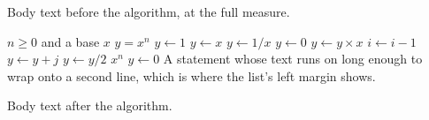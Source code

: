 \documentclass{article}
\begin{document}
Body text before the algorithm, at the full measure.

\begin{algorithmic}[1]
\Require $n \ge 0$ and a base $x$
\Ensure $y = x^{n}$
\State $y \gets 1$
  \State $y \gets x$ 
  \State $y \gets 1 / x$
\Else
  \State $y \gets 0$
\EndIf
{}
    \State $y \gets y \times x$
    \State $i \gets i - 1$
  \EndWhile
\EndFor
{}
  \State $y \gets y + j$
\EndFor
\Repeat
  \State $y \gets y / 2$
  \State \Return $x^{n}$
\EndFunction
{}
  \State $y \gets 0$
\EndProcedure
\Statex
\State A statement whose text runs on long enough to wrap onto a second line,
  which is where the list's left margin shows.
\end{algorithmic}

Body text after the algorithm.
\end{document}
